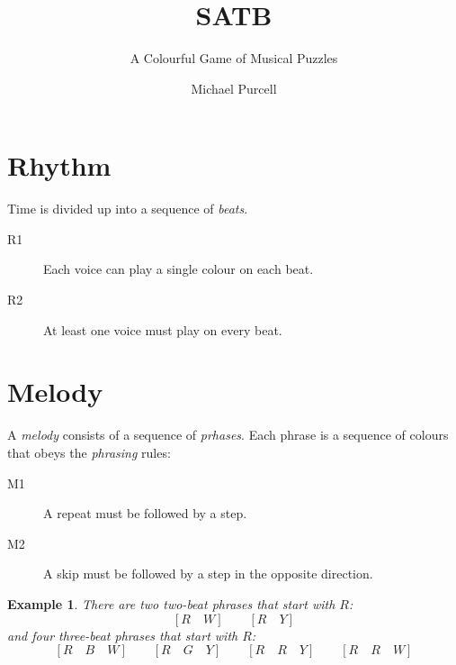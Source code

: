 \documentclass{scrartcl}
\title{SATB}
\subtitle{A Colourful Game of Musical Puzzles}
\author{Michael Purcell}
\date{}
\newtheorem{example}{Example}
\begin{document}
\maketitle
\section{Rhythm}
Time is divided up into a sequence of \emph{beats}.
\begin{description}
	\item[R1] Each voice can play a single colour on each beat.
	\item[R2] At least one voice must play on every beat.
\end{description}

\section{Melody}
A \emph{melody} consists of a sequence of \emph{prhases}. Each phrase is a sequence of colours that obeys the \emph{phrasing} rules:
\begin{description}
	\item[M1] A repeat must be followed by a step.
	\item[M2] A skip must be followed by a step in the opposite direction.
\end{description}

\begin{example}
There are two two-beat phrases that start with $R$:
\begin{equation}\nonumber
	[R \quad W] \qquad [R \quad Y]
\end{equation}
and four three-beat phrases that start with $R$:
\begin{equation}\nonumber
	[R \quad B \quad W] \qquad [R \quad G \quad Y] \qquad [R \quad R \quad Y] \qquad [R \quad R \quad W]
\end{equation}
\end{example}
\end{document}
